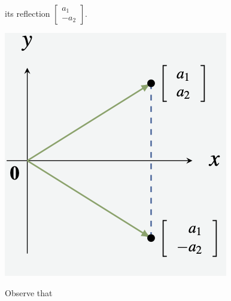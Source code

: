 \documentclass{article}
\begin{document}
its reflection $\begin{bmatrix}a_1\\-a_2\end{bmatrix}$.
%
\begin{center}\includegraphics[scale=0.55]{./figs/Ex2-2-13reflection.png}\end{center}
%
Observe that
\end{document}
